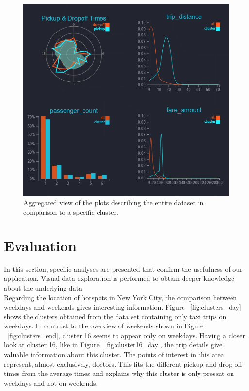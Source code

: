 \documentclass[sigconf, authorversion, nonacm=true]{acmart}
\begin{document}
\begin{figure}[h]
  \centering
  \includegraphics[width=0.95\linewidth]{sideplots}
  \caption{Aggregated view of the plots describing the entire dataset in comparison to a specific cluster.}
  \label{fig:sideplots}
\end{figure}






\section{Evaluation}
\label{sec:analysis}

In this section, specific analyses are presented that confirm the usefulness of our application. Visual data exploration is performed to obtain deeper knowledge about the underlying data.\\
Regarding the location of hotspots in New York City, the comparison between weekdays and weekends gives interesting information. Figure ~\ref{fig:clusters_day} shows the clusters obtained from the data set containing only taxi trips on weekdays. In contrast to the overview of weekends shown in Figure ~\ref{fig:clusters_end}, cluster 16 seems to appear only on weekdays. Having a closer look at cluster 16, like in Figure ~\ref{fig:cluster16_day}, the trip details give valuable information about this cluster. The points of interest in this area represent, almost exclusively, doctors. This fits the different pickup and drop-off times from the average times and explains why this cluster is only present on weekdays and not on weekends.
\end{document}
